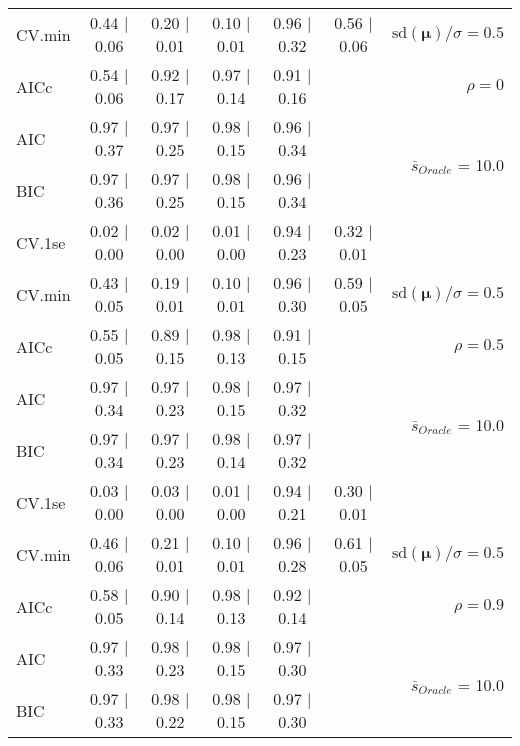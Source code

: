 \begin{table}
\begin{center}
\begin{tabular}{l*{5}{c}|r}
CV.min & 0.44 $\mid$ 0.06 & 0.20 $\mid$ 0.01 & 0.10 $\mid$ 0.01 & 0.96 $\mid$ 0.32 & 0.56 $\mid$ 0.06 &  $\mathrm{sd}(\mathbf{\mu})/\sigma=0.5$ \\
AICc & 0.54 $\mid$ 0.06 & 0.92 $\mid$ 0.17 & 0.97 $\mid$ 0.14 & 0.91 $\mid$ 0.16 & & $\rho=0$ \\
AIC & 0.97 $\mid$ 0.37 & 0.97 $\mid$ 0.25 & 0.98 $\mid$ 0.15 & 0.96 $\mid$ 0.34 & &  \multirow{2}{*}{$\bar{s}_{Oracle}$ = 10.0} \\
BIC & 0.97 $\mid$ 0.36 & 0.97 $\mid$ 0.25 & 0.98 $\mid$ 0.15 & 0.96 $\mid$ 0.34 & &  \\
 \hline 
CV.1se & 0.02 $\mid$ 0.00 & 0.02 $\mid$ 0.00 & 0.01 $\mid$ 0.00 & 0.94 $\mid$ 0.23 & 0.32 $\mid$ 0.01 & \\
CV.min & 0.43 $\mid$ 0.05 & 0.19 $\mid$ 0.01 & 0.10 $\mid$ 0.01 & 0.96 $\mid$ 0.30 & 0.59 $\mid$ 0.05 &  $\mathrm{sd}(\mathbf{\mu})/\sigma=0.5$ \\
AICc & 0.55 $\mid$ 0.05 & 0.89 $\mid$ 0.15 & 0.98 $\mid$ 0.13 & 0.91 $\mid$ 0.15 & & $\rho=0.5$ \\
AIC & 0.97 $\mid$ 0.34 & 0.97 $\mid$ 0.23 & 0.98 $\mid$ 0.15 & 0.97 $\mid$ 0.32 & &  \multirow{2}{*}{$\bar{s}_{Oracle}$ = 10.0} \\
BIC & 0.97 $\mid$ 0.34 & 0.97 $\mid$ 0.23 & 0.98 $\mid$ 0.14 & 0.97 $\mid$ 0.32 & &  \\
 \hline 
CV.1se & 0.03 $\mid$ 0.00 & 0.03 $\mid$ 0.00 & 0.01 $\mid$ 0.00 & 0.94 $\mid$ 0.21 & 0.30 $\mid$ 0.01 & \\
CV.min & 0.46 $\mid$ 0.06 & 0.21 $\mid$ 0.01 & 0.10 $\mid$ 0.01 & 0.96 $\mid$ 0.28 & 0.61 $\mid$ 0.05 &  $\mathrm{sd}(\mathbf{\mu})/\sigma=0.5$ \\
AICc & 0.58 $\mid$ 0.05 & 0.90 $\mid$ 0.14 & 0.98 $\mid$ 0.13 & 0.92 $\mid$ 0.14 & & $\rho=0.9$ \\
AIC & 0.97 $\mid$ 0.33 & 0.98 $\mid$ 0.23 & 0.98 $\mid$ 0.15 & 0.97 $\mid$ 0.30 & &  \multirow{2}{*}{$\bar{s}_{Oracle}$ = 10.0} \\
BIC & 0.97 $\mid$ 0.33 & 0.98 $\mid$ 0.22 & 0.98 $\mid$ 0.15 & 0.97 $\mid$ 0.30 & &  \\
 \hline 
\end{tabular}
\end{center}
\vspace{-1cm}
\end{table}




